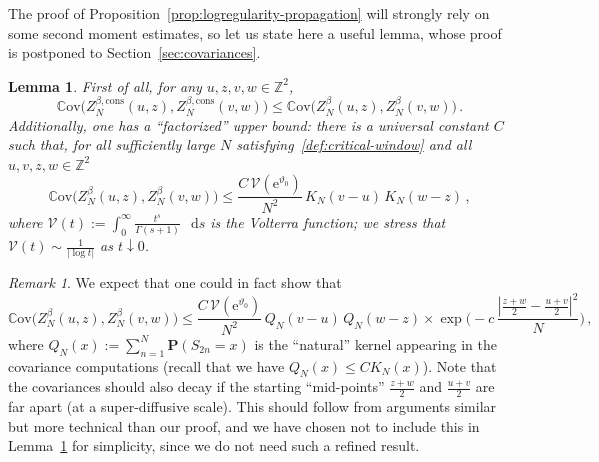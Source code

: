 \documentclass[11pt]{amsart}
\numberwithin{equation}{section}
\newcommand*{\bP}{\mathbf{P}}
\newcommand*{\numberset}{\mathbb}
\newcommand*{\Z}{\numberset{Z}}
\newcommand{\e}{\mathrm{e}}
\newcommand*{\cons}{\mathrm{cons}}
\newcommand*{\Cov}{\mathbb{C}\mathrm{ov}}
\newcommand*\dd{\mathop{}\!\mathrm{d}}
\theoremstyle{plain}
\newtheorem{lemma}[theorem]{Lemma}
\theoremstyle{definition}
\theoremstyle{remark}
\newtheorem{remark}[theorem]{Remark}
\begin{document}
        

The proof of Proposition~\ref{prop:logregularity-propagation} will strongly rely on some second moment estimates, so let us state here a useful lemma, whose proof is postponed to Section~\ref{sec:covariances}.


\begin{lemma}
       \label{lem:covariance}
       First of all, for any \(u,z,v,w \in \Z^2\),
       $$
       \Cov\bigl(Z_N^{\beta,\cons}(u,z),Z_N^{\beta,\cons}(v,w)\bigr)
       \le \Cov\bigl(Z_N^{\beta}(u,z),Z_N^{\beta}(v,w)\bigr) \,.
       $$
       Additionally, one has a ``factorized'' upper bound: there is a universal constant \(C\) such that, for all sufficiently large \(N\) satisfying~\eqref{def:critical-window} and all $u,v,z,w\in\Z^2$
       \begin{equation}
              \label{ineq:covariances}
              \Cov\bigl(Z_N^{\beta}(u,z),Z_N^{\beta}(v,w)\bigr)
              \le \frac{C \,\mathcal{V}(\e^{\vartheta_0})}{ N^2} \, K_N(v-u) \, K_N(w-z)\,,
       \end{equation}
       where \(\mathcal{V}(t):=\int_0^\infty \frac{t^s}{\Gamma(s+1)}\,\dd s\) is the Volterra function; we stress that \(\mathcal{V}(t) \sim \frac{1}{|\log t|}\) as \(t\downarrow 0\).
\end{lemma}



\begin{remark}
       We expect that one could in fact show that 
       \[
       \Cov\bigl(Z_N^{\beta}(u,z),Z_N^{\beta}(v,w)\bigr)
              \le \frac{C \,\mathcal{V}(\e^{\vartheta_0})}{ N^2} \, Q_N(v-u) \, Q_N(w-z) \times \exp\Big(- c \,\frac{|\frac{z+w}{2} -\frac{u+v}{2}|^2}{N} \Big) \,,
       \]
       where \(Q_N(x):= \sum_{n=1}^N \bP(S_{2n}=x)\) is the ``natural'' kernel appearing in the covariance computations (recall that we have \(Q_N(x)\leq C K_N(x)\)).
       Note that the covariances should also decay if the starting ``mid-points'' \(\frac{z+w}{2}\) and \(\frac{u+v}{2}\) are far apart (at a super-diffusive scale). 
       This should follow from arguments similar but more technical than our proof, and we have chosen not to include this in Lemma~\ref{lem:covariance} for simplicity, since we do not need such a refined result.
\end{remark}
\end{document}
